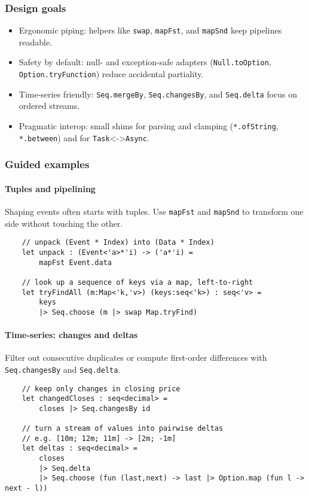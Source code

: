 \documentclass{article}
\begin{document}
\subsubsection{Design goals}
\begin{itemize}
  \item Ergonomic piping: helpers like \texttt{swap}, \texttt{mapFst}, and \texttt{mapSnd} keep pipelines readable.
  \item Safety by default: null- and exception-safe adapters (\texttt{Null.toOption}, \texttt{Option.tryFunction}) reduce accidental partiality.
  \item Time-series friendly: \texttt{Seq.mergeBy}, \texttt{Seq.changesBy}, and \texttt{Seq.delta} focus on ordered streams.
  \item Pragmatic interop: small shims for parsing and clamping (\texttt{*.ofString}, \texttt{*.between}) and for \texttt{Task}<->\texttt{Async}.
\end{itemize}

\subsubsection{Guided examples}

\paragraph{Tuples and pipelining}
Shaping events often starts with tuples. Use \texttt{mapFst} and \texttt{mapSnd} to transform one side without touching the other.
\begin{verbatim}
    // unpack (Event * Index) into (Data * Index)
    let unpack : (Event<'a>*'i) -> ('a*'i) =
        mapFst Event.data

    // look up a sequence of keys via a map, left-to-right
    let tryFindAll (m:Map<'k,'v>) (keys:seq<'k>) : seq<'v> =
        keys
        |> Seq.choose (m |> swap Map.tryFind)
\end{verbatim}

\paragraph{Time-series: changes and deltas}
Filter out consecutive duplicates or compute first-order differences with \texttt{Seq.changesBy} and \texttt{Seq.delta}.
\begin{verbatim}
    // keep only changes in closing price
    let changedCloses : seq<decimal> =
        closes |> Seq.changesBy id

    // turn a stream of values into pairwise deltas
    // e.g. [10m; 12m; 11m] -> [2m; -1m]
    let deltas : seq<decimal> =
        closes
        |> Seq.delta
        |> Seq.choose (fun (last,next) -> last |> Option.map (fun l -> next - l))
\end{verbatim}
\end{document}
